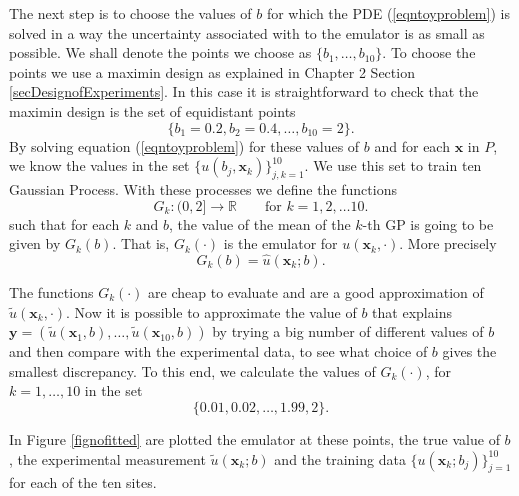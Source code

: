 \documentclass[12pt]{book}
\newcommand{\x}{\textbf{x}}
\newcommand{\y}{\textbf{y}}
\begin{document}
The next step is to choose  the values of $b$  for which the  PDE (\ref{eqntoyproblem}) is solved in a 
way the uncertainty associated with to the emulator is as small as possible. 
We shall denote the points we choose as $\{b_{1},\dots,b_{10}\}$. To choose the points 
we use a maximin design as explained in Chapter 2 Section \ref{secDesignofExperiments}. In this case
it is straightforward to check that the maximin design is the set of equidistant points
\begin{equation*}
\{b_{1}=0.2,b_{2}=0.4,\ldots,b_{10}=2\}.
\end{equation*}
\newline 
By solving equation (\ref{eqntoyproblem}) for these values of $b$ and for 
each $\x$ in $P$, we know the values in the set $\{u(b_{j},\x_{k})\}_{j,k=1}^{10}$.
We use this set  to train ten Gaussian Process. With these processes we define the functions 
\begin{equation*}
G_{k}:(0,2]\rightarrow\mathbb{R}\qquad\text{for }k=1,2,\ldots 10.
\end{equation*}
such that  for each $k$ and $b$,  the value of the mean of the $k$-th GP is going to be given by $G_{k}(b)$.
That is, $G_{k}(\cdot)$ is the emulator for $u(\x_{k},\cdot)$. More precisely
\begin{equation*}
G_{k}(b)=\hat{u}(\x_{k};b).
\end{equation*} 

The functions $G_{k}(\cdot)$ are cheap to evaluate and are a good 
approximation of $\tilde{u}(\x_{k},\cdot)$. Now it is possible
to approximate the value of $b$ that explains $\y=(\tilde{u}(\x_{1},b),
\ldots,\tilde{u}(\x_{10},b))$ by trying a big number of different values
of $b$ and then compare with the experimental data, to see what choice
of $b$ gives the smallest discrepancy. To this end, we calculate
the values of $G_{k}(\cdot)$, for $k=1,\ldots,10$ in the set
\begin{equation*}
\{0.01,0.02,\ldots,1.99,2\}.
\end{equation*}

 
In Figure \ref{fignofitted} are plotted  
the emulator at these points,  the true value of $b$, the experimental measurement $\tilde{u}(\x_{k};b)$
and the training data $\{u(\x_{k};b_{j})\}_{j=1}^{10}$ for each of the ten sites.



%
%
\end{document}
